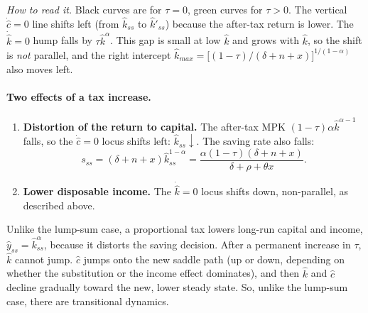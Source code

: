 \begin{center}
\end{center}
\emph{How to read it.} Black curves are for $\tau=0$, green curves for $\tau>0$. The vertical $\dot{\hat c}=0$ line shifts left (from $\hat k_{ss}$ to $\hat k'_{ss}$) because the after-tax return is lower. The $\dot{\hat k}=0$ hump falls by $\tau\hat k^\alpha$. This gap is small at low $\hat k$ and grows with $\hat k$, so the shift is \emph{not} parallel, and the right intercept $\hat k_{max}=\big[(1-\tau)/(\delta+n+x)\big]^{1/(1-\alpha)}$ also moves left.

\paragraph{Two effects of a tax increase.}
\begin{enumerate}
\item \textbf{Distortion of the return to capital.} The after-tax MPK $(1-\tau)\alpha\hat k^{\alpha-1}$ falls, so the $\dot{\hat c}=0$ locus shifts left: $\hat k_{ss}\downarrow$. The saving rate also falls:
\[
s_{ss}=(\delta+n+x)\hat k_{ss}^{1-\alpha}=\frac{\alpha(1-\tau)(\delta+n+x)}{\delta+\rho+\theta x}.
\]
\item \textbf{Lower disposable income.} The $\dot{\hat k}=0$ locus shifts down, non-parallel, as described above.
\end{enumerate}
\begin{keybox}[title={Proportional vs.\ lump-sum taxation}]
Unlike the lump-sum case, a proportional tax lowers long-run capital and income, $\hat y_{ss}=\hat k_{ss}^\alpha$, because it distorts the saving decision. After a permanent increase in $\tau$, $\hat k$ cannot jump. $\hat c$ jumps onto the new saddle path (up or down, depending on whether the substitution or the income effect dominates), and then $\hat k$ and $\hat c$ decline gradually toward the new, lower steady state. So, unlike the lump-sum case, there are transitional dynamics.
\end{keybox}

